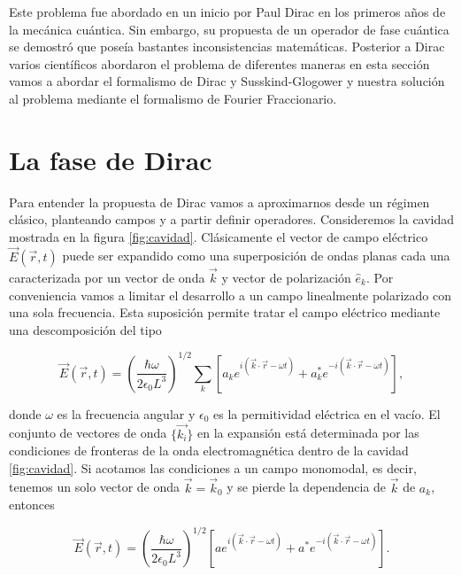     Este problema fue abordado en un inicio por Paul Dirac en los primeros años de la mecánica cuántica. Sin embargo, su propuesta de un operador de fase cuántica se demostró que poseía bastantes inconsistencias matemáticas. Posterior a Dirac varios científicos abordaron el problema de diferentes maneras en esta sección vamos a abordar el formalismo de Dirac y Susskind-Glogower y nuestra solución al problema mediante el formalismo de Fourier Fraccionario.
    
\section{La fase de Dirac}

        Para entender la propuesta de Dirac vamos a aproximarnos desde un régimen clásico, planteando campos y a partir definir operadores. Consideremos la cavidad mostrada en la figura \ref{fig:cavidad}. Clásicamente el vector de campo eléctrico $\vec{E}(\vec{r},t)$ puede ser expandido como una superposición de ondas planas cada una caracterizada por un vector de onda $\vec{k}$ y vector de polarización $\hat{e}_{k}$. Por conveniencia vamos a limitar el desarrollo a un campo linealmente polarizado con una sola frecuencia. Esta suposición permite tratar el campo eléctrico mediante una descomposición del tipo

        \begin{equation}
            \vec{E}(\vec{r},t) = \left( \frac{\hbar \omega}{2\epsilon_0 L^3} \right)^{1/2} \sum_k \left[a_k e^{i(\vec{k}\cdot \vec{r} - \omega t)} + a_k^* e^{-i( \vec{k}\cdot \vec{r} - \omega t )}  \right],
        \end{equation}

        donde $\omega$ es la frecuencia angular y $\epsilon_0$ es la permitividad eléctrica en el vacío. El conjunto de vectores de onda $\{\vec{k_i}\}$ en la expansión está determinada por las condiciones de fronteras de la onda electromagnética dentro de la cavidad \ref{fig:cavidad}. Si acotamos las condiciones a un campo monomodal, es decir, tenemos un solo vector de onda $\vec{k}=\vec{k}_0$ y se pierde la dependencia de $\vec{k}$ de $a_k$, entonces 

        \begin{equation}
            \vec{E}(\vec{r},t) = \left( \frac{\hbar \omega}{2\epsilon_0 L^3} \right)^{1/2} \left[ ae^{i( \vec{k}\cdot\vec{r} - \omega t )} + a^* e^{-i ( \vec{k}\cdot \vec{r} - \omega t )} \right].
        \end{equation}


